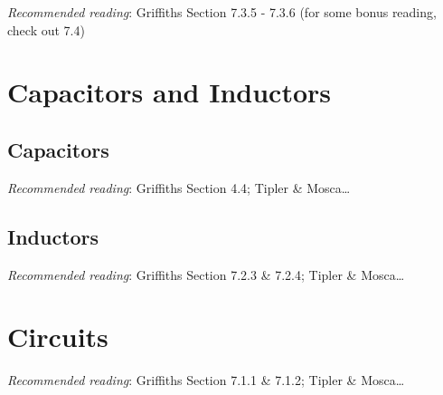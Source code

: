 \documentclass[
  letterpaper,
  DIV=11,
  numbers=noendperiod]{scrreprt}
\begin{document}
\newcommand{\l}{\mathrm{\mathbf{l}}}
\newcommand{\E}{\mathrm{\mathbf{E}}}
\newcommand{\F}{\mathrm{\mathbf{F}}}
\newcommand{\r}{\mathrm{\mathbf{r}}}

\newcommand{\x}{\mathrm{\mathbf{x}}}
\newcommand{\y}{\mathrm{\mathbf{y}}}
\newcommand{\z}{\mathrm{\mathbf{z}}}

\emph{Recommended reading}: Griffiths Section 7.3.5 - 7.3.6 (for some
bonus reading, check out 7.4)


\chapter{Capacitors and Inductors}\label{capacitors-and-inductors}

\newcommand{\l}{\mathrm{\mathbf{l}}}
\newcommand{\E}{\mathrm{\mathbf{E}}}
\newcommand{\F}{\mathrm{\mathbf{F}}}
\newcommand{\r}{\mathrm{\mathbf{r}}}

\newcommand{\x}{\mathrm{\mathbf{x}}}
\newcommand{\y}{\mathrm{\mathbf{y}}}
\newcommand{\z}{\mathrm{\mathbf{z}}}

\section{Capacitors}\label{capacitors}

\emph{Recommended reading}: Griffiths Section 4.4; Tipler \&
Mosca\ldots{}

\section{Inductors}\label{inductors}

\emph{Recommended reading}: Griffiths Section 7.2.3 \& 7.2.4; Tipler \&
Mosca\ldots{}


\chapter{Circuits}\label{circuits}

\newcommand{\l}{\mathrm{\mathbf{l}}}
\newcommand{\E}{\mathrm{\mathbf{E}}}
\newcommand{\F}{\mathrm{\mathbf{F}}}
\newcommand{\r}{\mathrm{\mathbf{r}}}

\newcommand{\x}{\mathrm{\mathbf{x}}}
\newcommand{\y}{\mathrm{\mathbf{y}}}
\newcommand{\z}{\mathrm{\mathbf{z}}}

\emph{Recommended reading}: Griffiths Section 7.1.1 \& 7.1.2; Tipler \&
Mosca\ldots{}
\end{document}
